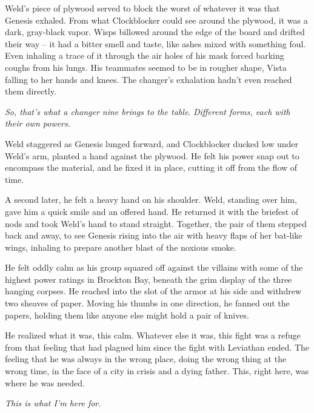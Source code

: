 Weld's piece of plywood served to block the worst of whatever it was that Genesis exhaled.  From what Clockblocker could see around the plywood, it was a dark, gray-black vapor.  Wisps billowed around the edge of the board and drifted their way – it had a bitter smell and taste, like ashes mixed with something foul.  Even inhaling a trace of it through the air holes of his mask forced barking coughs from his lungs.  His teammates seemed to be in rougher shape, Vista falling to her hands and knees.  The changer's exhalation hadn't even reached them directly.



\emph{So, that's what a changer nine brings to the table}.  \emph{Different forms, each with their own powers}.



Weld staggered as Genesis lunged forward, and Clockblocker ducked low under Weld's arm, planted a hand against the plywood.  He felt his power snap out to encompass the material, and he fixed it in place, cutting it off from the flow of time.



A second later, he felt a heavy hand on his shoulder.  Weld, standing over him, gave him a quick smile and an offered hand.  He returned it with the briefest of nods and took Weld's hand to stand straight.  Together, the pair of them stepped back and away, to see Genesis rising into the air with heavy flaps of her bat-like wings, inhaling to prepare another blast of the noxious smoke.



He felt\emph{ }oddly calm as his group squared off against the villains with some of the highest power ratings in Brockton Bay, beneath the grim display of the three hanging corpses.  He reached into the slot of the armor at his side and withdrew two sheaves of paper.  Moving his thumbs in one direction, he fanned out the papers, holding them like anyone else might hold a pair of knives.



He realized what it was, this calm.  Whatever else it was, this fight was a refuge from that feeling that had plagued him since the fight with Leviathan ended.  The feeling that he was always in the wrong place, doing the wrong thing at the wrong time, in the face of a city in crisis and a dying father.  This, right here, was where he was needed.  



\emph{This is what I'm here for}.





